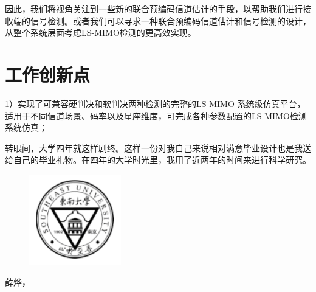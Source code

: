 \documentclass[bachelor,oneside]{seuthesis} %
\begin{document}
\begin{spacing}{1.5}
\begin{Main}
因此，我们将视角关注到一些新的联合预编码信道估计的手段，以帮助我们进行接收端的信号检测。或者我们可以寻求一种联合预编码信道估计和信号检测的设计，从整个系统层面考虑LS-MIMO检测的更高效实现。

\chapter{工作创新点}\label{chapter:7}
1）实现了可兼容硬判决和软判决两种检测的完整的LS-MIMO 系统级仿真平台，适用于不同信道场景、码率以及星座维度，可完成各种参数配置的LS-MIMO检测系统仿真；




\end{Main}


\begin{Acknowledgement}
转眼间，大学四年就这样剧终。这样一份对我自己来说相对满意毕业设计也是我送给自己的毕业礼物。在四年的大学时光里，我用了近两年的时间来进行科学研究。


\end{Acknowledgement}



\end{spacing}
\begin{Appendix}


\end{Appendix}

\newpage
\printindex %

\begin{Resume}
 \begin{figure}
   \vspace{-27pt}
   \begin{center}
     \includegraphics[width=4cm]{resume.pdf}
   \end{center}
   \vspace{-20pt}
 \end{figure}
 \noindent
 薛烨，
\clearpage

\clearpage
\end{Resume}
\end{document}
